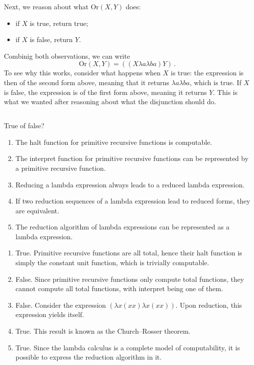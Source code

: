 \begin{solution}
\begin{enumerate}
	Next, we reason about what \(\mathrm{Or}(X, Y)\) does:
	\begin{itemize}
		\item if \(X\) is true, return true;
		\item if \(X\) is false, return \(Y\).
	\end{itemize}

	Combinig both observations, we can write
	\[
	\mathrm{Or}(X, Y) = ((X \lambda a \lambda b a) Y)\,.
	\]
	To see why this works, consider what happens when \(X\) is true:
	the expression is then of the second form above,
	meaning that it returns \(\lambda a \lambda b a\), which is true.
	If \(X\) is false, the expression is of the first form above,
	meaning it returns \(Y\).
	This is what we wanted after reasoning
	about what the disjunction should do.
\end{enumerate}
\end{solution}

\subsection{} %
True of false?
\begin{enumerate}
	\item The halt function for primitive recursive functions
	is computable.
	\item The interpret function for primitive recursive functions
	can be represented by a primitive recursive function.
	\item Reducing a lambda expression always leads
	to a reduced lambda expression.
	\item If two reduction sequences of a lambda expression
	lead to reduced forms, they are equivalent.
	\item The reduction algorithm of lambda expressions
	can be represented as a lambda expression.
\end{enumerate}

\begin{solution}
	\begin{enumerate}
		\item True.
		Primitive recursive functions are all total,
		hence their halt function is simply the constant unit function,
		which is trivially computable.
		\item False.
		Since primitive recursive functions
		only compute total functions,
		they cannot compute all total functions,
		with interpret being one of them.
		\item False.
		Consider the expression
		\((\lambda x (xx) \lambda x (xx))\).
		Upon reduction, this expression yields itself.
		\item True.
		This result is known as the Church--Rosser theorem.
		\item True.
		Since the lambda calculus is a complete model of computability,
		it is possible to express the reduction algorithm in it.
	\end{enumerate}
\end{solution}
